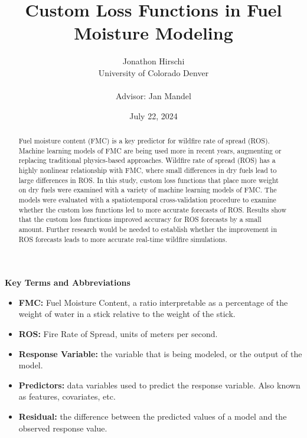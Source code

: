 \documentclass[11pt]{article}%
\begin{document}
 
\title{Custom Loss Functions in Fuel Moisture Modeling}
\author{
    \begin{tabular}[t]{c}
        Jonathon Hirschi \\
        University of Colorado Denver \\
        \\
        Advisor: Jan Mandel
    \end{tabular}
}

\date{July 22, 2024}
\maketitle

\begin{abstract}
Fuel moisture content (FMC) is a key predictor for wildfire rate of spread (ROS). Machine learning models of FMC are being used more in recent years, augmenting or replacing traditional physics-based approaches. Wildfire rate of spread (ROS) has a highly nonlinear relationship with FMC, where small differences in dry fuels lead to large differences in ROS. In this study, custom loss functions that place more weight on dry fuels were examined with a variety of machine learning models of FMC. The models were evaluated with a spatiotemporal cross-validation procedure to examine whether the custom loss functions led to more accurate forecasts of ROS. Results show that the custom loss functions improved accuracy for ROS forecasts by a small amount. Further research would be needed to establish whether the improvement in ROS forecasts leads to more accurate real-time wildfire simulations.
\end{abstract}

\textbf{Key Terms and Abbreviations}
\begin{itemize}
    \item \textbf{FMC:} Fuel Moisture Content, a ratio interpretable as a percentage of the weight of water in a stick relative to the weight of the stick.
    \item \textbf{ROS:} Fire Rate of Spread, units of meters per second.
    \item \textbf{Response Variable:} the variable that is being modeled, or the output of the model.
    \item \textbf{Predictors:} data variables used to predict the response variable. Also known as features, covariates, etc.
    \item \textbf{Residual:} the difference between the predicted values of a model and the observed response value.
\end{itemize}
\end{document}

